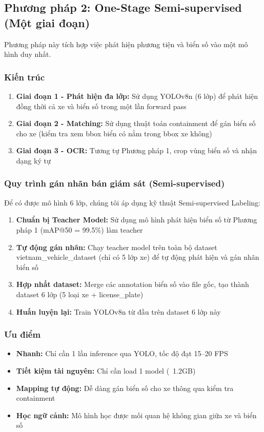 \subsection{Phương pháp 2: One-Stage Semi-supervised (Một giai đoạn)}

Phương pháp này tích hợp việc phát hiện phương tiện và biển số vào một mô hình duy nhất.

\subsubsection{Kiến trúc}
\begin{enumerate}
    \item \textbf{Giai đoạn 1 - Phát hiện đa lớp:} Sử dụng YOLOv8n (6 lớp) để phát hiện đồng thời cả xe và biển số trong một lần forward pass
    \item \textbf{Giai đoạn 2 - Matching:} Sử dụng thuật toán containment để gán biển số cho xe (kiểm tra xem bbox biển có nằm trong bbox xe không)
    \item \textbf{Giai đoạn 3 - OCR:} Tương tự Phương pháp 1, crop vùng biển số và nhận dạng ký tự
\end{enumerate}

\subsubsection{Quy trình gán nhãn bán giám sát (Semi-supervised)}
Để có được mô hình 6 lớp, chúng tôi áp dụng kỹ thuật Semi-supervised Labeling:
\begin{enumerate}
    \item \textbf{Chuẩn bị Teacher Model:} Sử dụng mô hình phát hiện biển số từ Phương pháp 1 (mAP@50 = 99.5\%) làm teacher
    \item \textbf{Tự động gán nhãn:} Chạy teacher model trên toàn bộ dataset vietnam\_vehicle\_dataset (chỉ có 5 lớp xe) để tự động phát hiện và gán nhãn biển số
    \item \textbf{Hợp nhất dataset:} Merge các annotation biển số vào file gốc, tạo thành dataset 6 lớp (5 loại xe + license\_plate)
    \item \textbf{Huấn luyện lại:} Train YOLOv8n từ đầu trên dataset 6 lớp này
\end{enumerate}

\subsubsection{Ưu điểm}
\begin{itemize}
    \item \textbf{Nhanh:} Chỉ cần 1 lần inference qua YOLO, tốc độ đạt 15--20 FPS
    \item \textbf{Tiết kiệm tài nguyên:} Chỉ cần load 1 model (~1.2GB)
    \item \textbf{Mapping tự động:} Dễ dàng gán biển số cho xe thông qua kiểm tra containment
    \item \textbf{Học ngữ cảnh:} Mô hình học được mối quan hệ không gian giữa xe và biển số
\end{itemize}

